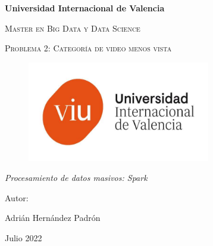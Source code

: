\documentclass[a4paper]{article}
\begin{document}
\begin{titlepage}
    \centering
    {\bfseries\LARGE Universidad Internacional de Valencia \par}
    \vspace{1cm}
    {\scshape\Large Master en Big Data y Data Science \par}
    \vspace{3cm}
    {\scshape\Huge Problema 2: Categoría de video menos vista \par}
    \vspace{1cm}
    \begin{figure}[h]
        \centering
        \includegraphics[width=8cm, keepaspectratio]{Nuevo-Logo-1.jpg}

    \end{figure}
    \vspace{1cm}
    {\itshape\Large Procesamiento de datos masivos: Spark \par}
    \vspace{3cm}
    {\Large Autor: \par}
    {\Large Adrián Hernández Padrón \par}
    {\Large Julio 2022 \par}


\end{titlepage}
\clearpage
\end{document}
